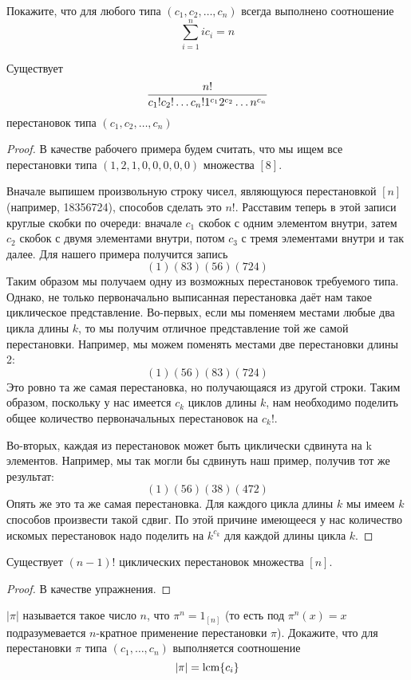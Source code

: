 \begin{exercise}
Покажите, что для любого типа $(c_1, c_2, \ldots, c_n)$ всегда выполнено соотношение
$$\sum_{i=1}^n ic_i = n$$
\end{exercise}

\begin{thm}
Существует
$${n!\over c_1!c_2!\ldots c_n!1^{c_1}2^{c_2}\ldots n^{c_n}}$$
перестановок типа $(c_1, c_2, \ldots, c_n)$
\end{thm}
\begin{proof}
В качестве рабочего примера будем считать, что мы ищем все перестановки типа $(1, 2, 1, 0, 0, 0, 0, 0)$ множества $[8]$.

Вначале выпишем произвольную строку чисел, являющуюся перестановкой $[n]$ (например, 18356724), способов сделать это $n!$. Расставим теперь в этой записи круглые скобки по очереди: вначале $c_1$ скобок с одним элементом внутри, затем $c_2$ скобок с двумя элементами внутри, потом $c_3$ с тремя элементами внутри и так далее. Для нашего примера получится запись
$$(1)(83)(56)(724)$$
Таким образом мы получаем одну из возможных перестановок требуемого типа. Однако, не только первоначально выписанная перестановка даёт нам такое циклическое представление. Во-первых, если мы поменяем местами любые два цикла длины $k$, то мы получим отличное представление той же самой перестановки. Например, мы можем поменять местами две перестановки длины 2:
$$(1)(56)(83)(724)$$
Это ровно та же самая перестановка, но получающаяся из другой строки. Таким образом, поскольку у нас имеется $c_k$ циклов длины $k$, нам необходимо поделить общее количество первоначальных перестановок на $c_k!$.

Во-вторых, каждая из перестановок может быть циклически сдвинута на k элементов. Например, мы так могли бы сдвинуть наш пример, получив тот же результат:
$$(1)(56)(38)(472)$$
Опять же это та же самая перестановка. Для каждого цикла длины $k$ мы имеем $k$ способов произвести такой сдвиг. По этой причине имеющееся у нас количество искомых перестановок надо поделить на $k^{c_k}$ для каждой длины цикла $k$.
\end{proof}
\begin{corollary}
Существует $(n-1)!$ циклических перестановок множества $[n]$.
\end{corollary}
\begin{proof}
В качестве упражнения.
\end{proof}

\begin{exercise}
 $|\pi|$ называется такое число $n$, что $\pi^n = 1_{[n]}$ (то есть под $\pi^n(x) = x$ подразумевается $n$-кратное применение перестановки $\pi$). Докажите, что для перестановки $\pi$ типа $(c_1, \ldots, c_n)$  выполняется соотношение
$$|\pi| = \operatorname{lcm}\{c_i\}$$
\end{exercise}

